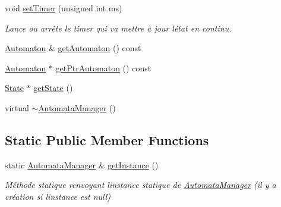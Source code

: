 \begin{DoxyCompactItemize}
void \mbox{\hyperlink{class_automata_manager_a53cfb719a7610e1e60145a83e886bb46}{set\+Timer}} (unsigned int ms)
\begin{DoxyCompactList}\small\item\em Lance ou arrête le timer qui va mettre à jour l\textquotesingle{}état en continu. \end{DoxyCompactList}\item 
\mbox{\hyperlink{class_automaton}{Automaton}} \& \mbox{\hyperlink{class_automata_manager_a2b33d81658dc1daada4e814775cd444f}{get\+Automaton}} () const
\item 
\mbox{\hyperlink{class_automaton}{Automaton}} $\ast$ \mbox{\hyperlink{class_automata_manager_a7c7cdad76b400d996bcb6294e8ee49a1}{get\+Ptr\+Automaton}} () const
\item 
\mbox{\hyperlink{class_state}{State}} $\ast$ \mbox{\hyperlink{class_automata_manager_a8b4f4aeec453227f833bbd21cd8b7634}{get\+State}} ()
\item 
virtual \mbox{\hyperlink{class_automata_manager_a1f919c8a4a4ca089baf3657c26eb4be7}{$\sim$\+Automata\+Manager}} ()
\end{DoxyCompactItemize}
\subsection*{Static Public Member Functions}
\begin{DoxyCompactItemize}
\item 
static \mbox{\hyperlink{class_automata_manager}{Automata\+Manager}} \& \mbox{\hyperlink{class_automata_manager_a655cc3cb08c8548799ce7b5176bbb262}{get\+Instance}} ()
\begin{DoxyCompactList}\small\item\em Méthode statique renvoyant l\textquotesingle{}instance statique de \mbox{\hyperlink{class_automata_manager}{Automata\+Manager}} (il y a création si l\textquotesingle{}instance est null) \end{DoxyCompactList}\end{DoxyCompactItemize}
